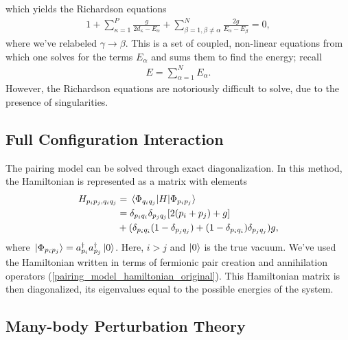 \documentclass[10pt]{article}
\begin{document}
which yields the Richardson equations
\begin{align}
\label{richardson_equations}
1
+
\sum_{\kappa=1}^P
\frac{g}{2d_\kappa-E_\alpha}
+
\sum_{\beta=1,\beta\neq\alpha}^N
\frac{2g}{E_\alpha-E_\beta}
=
0
,\end{align}
where we've relabeled $\gamma\to\beta$. This is a set of coupled, non-linear equations from which one solves for the terms $E_\alpha$ and sums them to find the energy; recall
\begin{align}
E=\sum_{\alpha=1}^N E_\alpha
.\end{align}
However, the Richardson equations are notoriously difficult to solve, due to the presence of singularities.

\subsection{Full Configuration Interaction}

The pairing model can be solved through exact diagonalization. In this method, the Hamiltonian is represented as a matrix with elements
\begin{align}
H_{p_ip_j,q_iq_j}
&=
\mel*{\Phi_{q_iq_j}}H{\Phi_{p_ip_j}}
\nonumber
\\
&=
\delta_{p_iq_i}\delta_{p_jq_j}[2(p_i+p_j)+g]
\nonumber
\\
&+
(\delta_{p_iq_i}(1-\delta_{p_jq_j})+(1-\delta_{p_iq_i})\delta_{p_jq_j})g
,\end{align}
where $\ket*{\Phi_{p_ip_j}}= a^\dagger_{p_i}a^\dagger_{p_j}\ket{0}$. Here, $i>j$ and $\ket{0}$ is the true vacuum. We've used the Hamiltonian written in terms of fermionic pair creation and annihilation operators (\ref{pairing_model_hamiltonian_original}). This Hamiltonian matrix is then diagonalized, its eigenvalues equal to the possible energies of the system.

\subsection{Many-body Perturbation Theory}
\label{subsection:mbpt}
\end{document}
